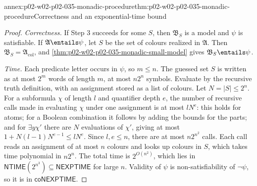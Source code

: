 \begin{annexitem}{annex:p02-w02-p02-035-monadic-procedure}{thm:p02-w02-p02-035-monadic-procedure}{Correctness and an exponential-time bound}
\begin{proof}
\emph{Correctness.}  If Step 3 succeeds for some \(S\), then
\(\mathfrak B_S\) is a model and \(\psi\) is satisfiable.  If
\(\mathfrak A\entails\psi\), let \(S\) be the set of colours realized in
\(\mathfrak A\).  Then \(\mathfrak B_S=\mathfrak A_{\mathrm{col}}\), and
\cref{thm:p02-w02-p02-035-monadic-small-model} gives
\(\mathfrak B_S\entails\psi\).

\emph{Time.}  Each predicate letter occurs in \(\psi\), so \(m\leq n\).  The
guessed set \(S\) is written as at most \(2^m\) words of length \(m\), at most
\(n2^n\) symbols.  Evaluate by the recursive truth definition, with an
assignment stored as a list of colours.  Let \(N=\lvert S\rvert\leq2^n\).  For
a subformula \(\chi\) of length \(l\) and quantifier depth \(e\), the number
of recursive calls made in evaluating \(\chi\) under one assignment is at most
\(lN^{e}\): this holds for atoms; for a Boolean combination it follows by
adding the bounds for the parts; and for \(\exists y\chi'\) there are \(N\)
evaluations of \(\chi'\), giving at most \(1+N(l-1)N^{e-1}\leq lN^e\).  Since
\(l,e\leq n\), there are at most \(n2^{n^2}\) calls.  Each call reads an
assignment of at most \(n\) colours and looks up colours in \(S\), which takes
time polynomial in \(n2^n\).  The total time is \(2^{O(n^2)}\), which lies in
\(\mathsf{NTIME}(2^{n^3})\subseteq\mathsf{NEXPTIME}\) for large \(n\).
Validity of \(\psi\) is non-satisfiability of \(\neg\psi\), so it is in
\(\mathsf{coNEXPTIME}\).
\end{proof}
\end{annexitem}

